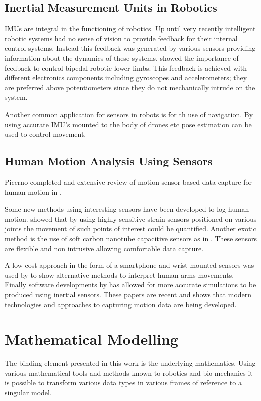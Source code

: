 \subsection{Inertial Measurement Units in Robotics}
IMUs are integral in the functioning of robotics. Up until very recently intelligent robotic systems had no sense of vision to provide feedback for their internal control systems. Instead this feedback was generated by various sensors providing information about the dynamics of these systems. \cite{kaneko2002legs} showed the importance of feedback to control bipedal robotic lower limbs. This feedback is achieved with different electronics components including gyroscopes and accelerometers; they are preferred above potentiometers since they do not mechanically intrude on the system.

Another common application for sensors in robots is for th use of navigation. By using accurate IMU's mounted to the body of drones etc pose estimation can be used to control movement. 

\subsection{Human Motion Analysis Using Sensors}
Picerno completed and extensive review of motion sensor based data capture for human motion in \cite{picerno201725}. 

Some new methods using interesting sensors have been developed to log human motion. \cite{wang2014wearable} showed that by using highly sensitive strain sensors positioned on various joints the movement of such points of interest could be quantified. Another exotic method is the use of soft carbon nanotube capacitive sensors as in \cite{cai2013super}. These sensors are flexible and non intrusive allowing comfortable data capture.

A low cost approach in the form of a smartphone and wrist mounted sensors was used by \cite{shoaib2016complex} to show alternative methods to interpret human arms movements. Finally software developments by \cite{sun2017new} has allowed for more accurate simulations to be produced using inertial sensors. These papers are recent and shows that modern technologies and approaches to capturing motion data are being developed.


\section{Mathematical Modelling}
The binding element presented in this work is the underlying mathematics. Using various mathematical tools and methods known to robotics and bio-mechanics it is possible to transform various data types in various frames of reference to a singular model.


